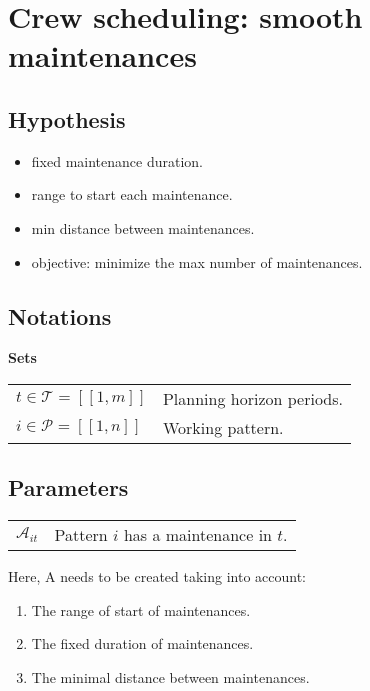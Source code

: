 \documentclass[a4paper,11pt]{article}
\begin{document}
\clearpage

\section{Crew scheduling: smooth maintenances}

    \subsection{Hypothesis}

    \begin{itemize}
     \item fixed maintenance duration.
     \item range to start each maintenance.
     \item min distance between maintenances.
     \item objective: minimize the max number of maintenances.
    \end{itemize}

    \subsection{Notations}

    \textbf{Sets}

    \begin{tabular}{ll}
    $t\in \mathcal{T} = [\![1, m]\!]$ & Planning horizon periods. \\
    $i \in \mathcal{P} = [\![1, n]\!]$ & Working pattern.\\
    \end{tabular}

    \vskip 0.3cm

    \subsection{Parameters}

    \begin{tabular}{ll}
        $\mathcal{A}_{it}$ & Pattern $i$ has a maintenance in $t$.\\
    \end{tabular}

    \vskip 0.3cm

    Here, A needs to be created taking into account:

    \begin{enumerate}
        \item The range of start of maintenances.
        \item The fixed duration of maintenances.
        \item The minimal distance between maintenances.
    \end{enumerate}
\end{document}
